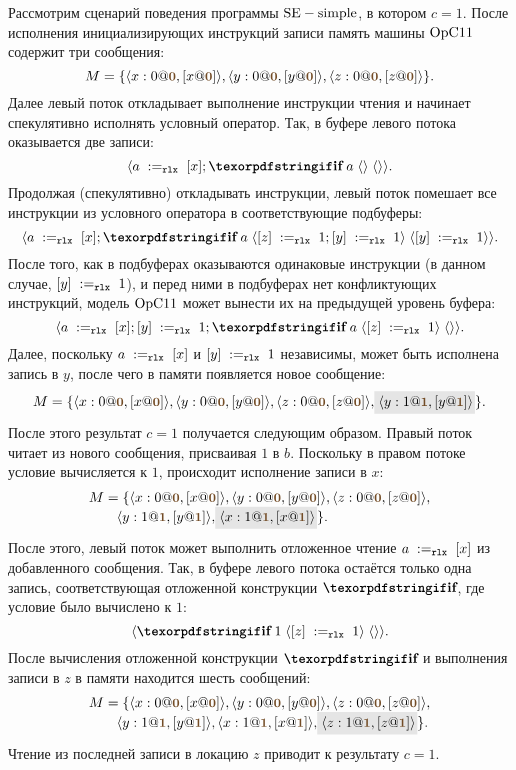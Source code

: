Рассмотрим сценарий поведения программы ${\rm SE-simple}$, в котором $c = 1$.
После исполнения инициализирующих инструкций записи память машины $\mathrm{OpC11}$ содержит три сообщения:
\[
M = \{\angled{x:0@\tstamp{0}, [x@\tstamp{0}]}, \angled{y:0@\tstamp{0},[y@\tstamp{0}]},
      \angled{z:0@\tstamp{0},[z@\tstamp{0}]}\}.
\]
Далее левый поток откладывает выполнение инструкции чтения и начинает спекулятивно исполнять условный оператор.
Так, в буфере левого потока оказывается две записи:
\[\angled{\readInstParam{\rlx}{a}{x}; \kw{if} \; a \; \angled{} \; \angled{}}.\]
Продолжая (спекулятивно) откладывать инструкции, левый поток помешает все инструкции из
условного оператора в соответствующие подбуферы:
\[\angled{\readInstParam{\rlx}{a}{x};
  \kw{if} \; a \; \angled{\writeInstParam{\rlx}{z}{1}; \writeInstParam{\rlx}{y}{1}} \;
  \angled{\writeInstParam{\rlx}{y}{1}}}.\]
После того, как в подбуферах оказываются одинаковые инструкции
(в данном случае, $[y] \;:=_{\mathtt{rlx}}\;1$), и перед ними в подбуферах нет
конфликтующих инструкций, модель $\mathrm{OpC11}$ может вынести их на предыдущей уровень буфера:
\[\angled{\readInstParam{\rlx}{a}{x}; \writeInstParam{\rlx}{y}{1};
  \kw{if} \; a \; \angled{\writeInstParam{\rlx}{z}{1}} \;
  \angled{} }.\]
Далее, поскольку $a \;:=_{\mathtt{rlx}}\;[x]$ и $[y] \;:=_{\mathtt{rlx}}\;1$
независимы, может быть исполнена запись в $y$, после чего в памяти появляется новое сообщение:
\[
\begin{array}{@{}l@{}}
M = \{\angled{x:0@\tstamp{0}, [x@\tstamp{0}]}, \angled{y:0@\tstamp{0},[y@\tstamp{0}]},
      \angled{z:0@\tstamp{0},[z@\tstamp{0}]}, \graybox{\angled{y:1@\tstamp{1},[y@\tstamp{1}]}}\}.
\end{array}
\]
После этого результат $c = 1$ получается следующим образом.
Правый поток читает из нового сообщения, присваивая $1$ в $b$.
Поскольку в правом потоке условие вычисляется к $1$, происходит исполнение записи в $x$:
\[
\begin{array}{@{}l@{}}
M = \{\angled{x:0@\tstamp{0}, [x@\tstamp{0}]}, \angled{y:0@\tstamp{0},[y@\tstamp{0}]}, \angled{z:0@\tstamp{0},[z@\tstamp{0}]}, \\
\qquad \angled{y:1@\tstamp{1},[y@\tstamp{1}]}, \graybox{\angled{x:1@\tstamp{1},[x@\tstamp{1}]}}\}.
\end{array}
\]
После этого, левый поток может выполнить отложенное чтение $a \;:=_{\mathtt{rlx}}\;[x]$ из добавленного сообщения.
Так, в буфере левого потока остаётся только одна запись, соответствующая отложенной конструкции $\kw{if}$, где
условие было вычислено к $1$:
\[\angled{
  \kw{if} \; 1 \; \angled{\writeInstParam{\rlx}{z}{1}} \;
  \angled{}}.\]
После вычисления отложенной конструкции $\kw{if}$ и выполнения записи в $z$ в памяти находится шесть сообщений:
\[
\begin{array}{@{}l@{}}
M = \{\angled{x:0@\tstamp{0}, [x@\tstamp{0}]}, \angled{y:0@\tstamp{0},[y@\tstamp{0}]}, \angled{z:0@\tstamp{0},[z@\tstamp{0}]}, \\
\qquad \angled{y:1@\tstamp{1},[y@\tstamp{1}]}, \angled{x:1@\tstamp{1},[x@\tstamp{1}]}, \graybox{\angled{z:1@\tstamp{1},[z@\tstamp{1}]}}\}.
\end{array}
\]
Чтение из последней записи в локацию $z$ приводит к результату $c = 1$.


